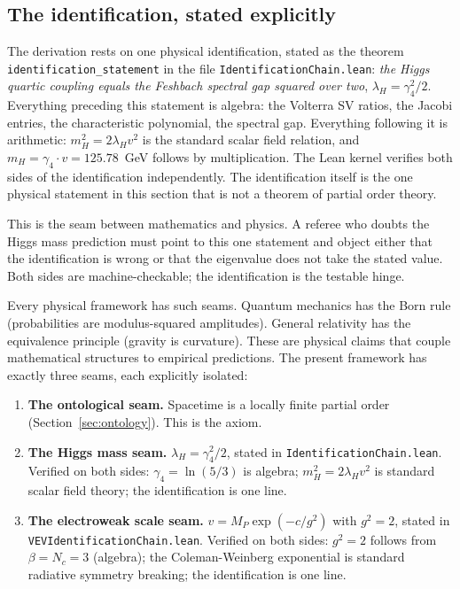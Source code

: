\documentclass[11pt,letterpaper]{article}
\theoremstyle{remark}
\newcommand{\lean}[1]{\texttt{\small #1}}
\begin{document}
\subsection{The identification, stated explicitly}
\label{sec:identification}

The derivation rests on one physical identification, stated as the
theorem \lean{identification\_\allowbreak statement} in the file
\lean{Identification\-Chain.lean}: \emph{the Higgs quartic coupling
equals the Feshbach spectral gap squared over two},
$\lambda_H = \gamma_4^2/2$. Everything preceding this statement is
algebra: the Volterra SV ratios, the Jacobi entries, the
characteristic polynomial, the spectral gap. Everything following it
is arithmetic: $m_H^2 = 2\lambda_H v^2$ is the standard scalar field
relation, and $m_H = \gamma_4 \cdot v = 125.78$~GeV follows by
multiplication. The Lean kernel verifies both sides of the
identification independently. The identification itself is the one
physical statement in this section that is not a theorem of partial
order theory.

This is the seam between mathematics and physics. A referee who
doubts the Higgs mass prediction must point to this one statement
and object either that the identification is wrong or that the
eigenvalue does not take the stated value. Both sides are
machine-checkable; the identification is the testable hinge.

Every physical framework has such seams. Quantum mechanics has the
Born rule (probabilities are modulus-squared amplitudes). General
relativity has the equivalence principle (gravity is curvature).
These are physical claims that couple mathematical structures to
empirical predictions. The present framework has exactly three
seams, each explicitly isolated:

\begin{enumerate}[nosep]
  \item \textbf{The ontological seam.} Spacetime is a locally finite
    partial order (Section~\ref{sec:ontology}). This is the axiom.
  \item \textbf{The Higgs mass seam.} $\lambda_H = \gamma_4^2/2$,
    stated in \lean{Identification\-Chain.lean}. Verified on both
    sides: $\gamma_4 = \ln(5/3)$ is algebra;
    $m_H^2 = 2\lambda_H v^2$ is standard scalar field theory; the
    identification is one line.
  \item \textbf{The electroweak scale seam.} $v = M_P \exp(-c/g^2)$
    with $g^2 = 2$, stated in
    \lean{VEVIdentification\-Chain.lean}. Verified on both sides:
    $g^2 = 2$ follows from $\beta = N_c = 3$ (algebra); the
    Coleman-Weinberg exponential is standard radiative symmetry
    breaking; the identification is one line.
\end{enumerate}
\end{document}
